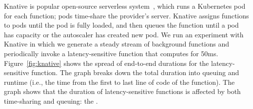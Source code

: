 Knative is popular open-source serverless system~\cite{knative}, which
runs a Kubernetes pod for each function; pods time-share the
provider's server. Knative assigns functions to pods until the pod is
fully loaded, and then queues the function until a pod has capacity or
the autoscaler has created new pod.  We run an experiment with Knative
in which we generate a steady stream of background functions and
periodically invoke a latency-sensitive function that computes for
50ms. Figure~\ref{fig:knative} shows the spread of end-to-end
durations for the latency-sensitive function.  The graph breaks down
the total duration into queuing and runtime (i.e., the time from the
first to last line of code of the function).  The graph shows that the
duration of latency-sensitive functions is affected by both
time-sharing and queuing: the \problem{}.






